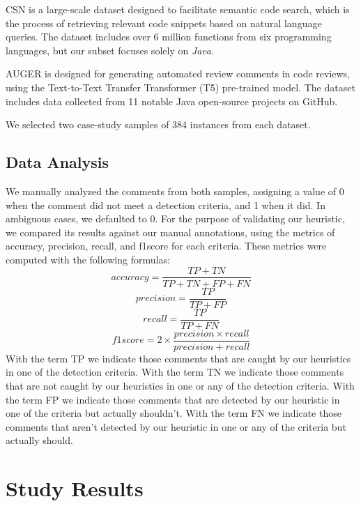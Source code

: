\noindent CSN is a large-scale dataset designed to facilitate semantic code search, which is the process of retrieving relevant code snippets based on natural language queries.
The dataset includes over 6 million functions from six programming languages, but our subset focuses solely on \textit{Java}.

\noindent AUGER is designed for generating automated review comments in code reviews, using the Text-to-Text Transfer Transformer (T5) pre-trained model. The dataset includes data collected from 11 notable Java open-source projects on GitHub.

\noindent We selected two case-study samples of 384 instances from each dataset.

\subsection{Data Analysis}
We manually analyzed the comments from both samples, assigning a value of 0 when the comment did not meet a detection criteria, and 1 when it did. In ambiguous cases, we defaulted to 0. 
For the purpose of validating our heuristic, we compared its results against our manual annotations, using the metrics of accuracy, precision, recall, and f1score for each criteria. These metrics were computed with the following formulas:
\begin{equation*}
	accuracy = \frac{TP + TN}{TP + TN + FP + FN}		
\end{equation*}
\begin{equation*}
	precision = \frac{TP}{TP + FP}
\end{equation*}
\begin{equation*}
	recall = \frac{TP}{TP + FN}
\end{equation*}
\begin{equation*}
	f1score = 2 \times \frac{precision \times recall}{precision + recall}
\end{equation*}
With the term TP we indicate those comments that are caught by our heuristics in one of the detection criteria. With the term TN we indicate those comments that are not caught by our heuristics in one or any of the detection criteria. With the term FP we indicate those comments that are detected by our heuristic in one of the criteria but actually shouldn't. With the term FN we indicate those comments that aren't detected by our heuristic in one or any of the criteria but actually should.

\newpage

\section{Study Results}

